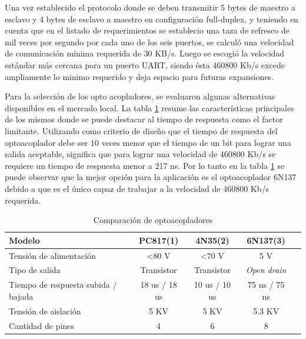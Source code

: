 Una vez establecido el protocolo donde se deben transmitir 5 bytes de maestro a esclavo y 4 bytes de esclavo a maestro en configuración full-duplex, y teniendo en cuenta que en el listado de requerimientos se establecio una taza de refresco de mil veces por segundo por cada uno de los seis puertos, se calculó una velocidad de comunicación mínima requerida de 30 KB/s. Luego se escogió la velocidad estándar más cercana para un puerto UART, siendo ésta 460800 Kb/s excede ampliamente lo minimo requerido y deja espacio para futuras expansiones.

Para la selección de los opto acopladores, se evaluaron algunas alternativas disponibles en el mercado local. La tabla \ref{tab:Optos} resume las características principales de los mismos donde se puede destacar al tiempo de respuesta como el factor limitante. 
Utilizando como criterio de diseño que el tiempo de respuesta del optoacoplador debe ser 10 veces menor que el tiempo de un bit para lograr una salida aceptable, significa que para lograr una velocidad de 460800 Kb/s se requiere un tiempo de respuesta menor a 217 ns. Por lo tanto en la tabla \ref{tab:Optos} se puede observar que la mejor opción para la aplicación es el optoacoplador 6N137 debido a que es el único capaz de trabajar a la velocidad de 460800 Kb/s requerida.

	\begin{table}[h]
	\centering
	\caption[Tabla de comparación de optoacopladores para la interfaz UART optoaislada]{Comparación de optoacopladores}
	\begin{tabular}{l c c c c}    
		\toprule
		\textbf{Modelo} 	 & \textbf{PC817(1)} & \textbf{4N35(2)}& \textbf{6N137(3)}	\\
		\midrule
Tensión de alimentación             & \textless{}80 V & \textless{}70 V & 5 V           &  \\
Tipo de salida                      & Transistor      & Transistor      & \emph{Open drain}    &  \\
Tiempo de respuesta subida / bajada & 18 us / 18 us   & 10 us / 10 us   & 75 ns / 75 ns &  \\
Tensión de aislación                & 5 KV            & 5 KV            & 5.3 KV        &  \\
Cantidad de pines                   & 4               & 6               & 8             & \\
		\bottomrule
		\hline
	\end{tabular}
	\label{tab:Optos}
\end{table}


